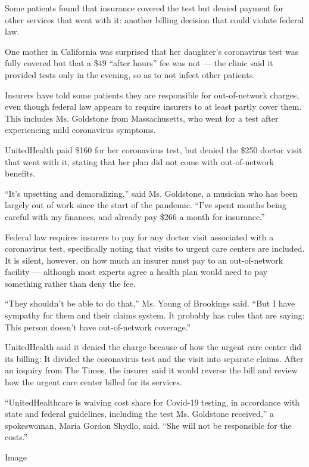 Some patients found that insurance covered the test but denied payment
for other services that went with it: another billing decision that
could violate federal law.

One mother in California was surprised that her daughter's coronavirus
test was fully covered but that a \$49 ``after hours'' fee was not ---
the clinic said it provided tests only in the evening, so as to not
infect other patients.

Insurers have told some patients they are responsible for out-of-network
charges, even though federal law appears to require insurers to at least
partly cover them. This includes Ms. Goldstone from Massachusetts, who
went for a test after experiencing mild coronavirus symptoms.

UnitedHealth paid \$160 for her coronavirus test, but denied the \$250
doctor visit that went with it, stating that her plan did not come with
out-of-network benefits.

``It's upsetting and demoralizing,'' said Ms. Goldstone, a musician who
has been largely out of work since the start of the pandemic. ``I've
spent months being careful with my finances, and already pay \$266 a
month for insurance.''

Federal law requires insurers to pay for any doctor visit associated
with a coronavirus test, specifically noting that visits to urgent care
centers are included. It is silent, however, on how much an insurer must
pay to an out-of-network facility --- although most experts agree a
health plan would need to pay something rather than deny the fee.

``They shouldn't be able to do that,'' Ms. Young of Brookings said.
``But I have sympathy for them and their claims system. It probably has
rules that are saying: This person doesn't have out-of-network
coverage.''

UnitedHealth said it denied the charge because of how the urgent care
center did its billing: It divided the coronavirus test and the visit
into separate claims. After an inquiry from The Times, the insurer said
it would reverse the bill and review how the urgent care center billed
for its services.

``UnitedHealthcare is waiving cost share for Covid-19 testing, in
accordance with state and federal guidelines, including the test Ms.
Goldstone received,'' a spokeswoman, Maria Gordon Shydlo, said. ``She
will not be responsible for the costs.''

Image


